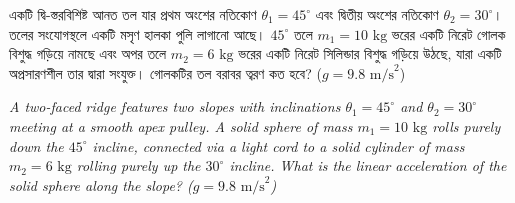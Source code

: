\documentclass[12pt, a4paper]{article}
\begin{document}
\begin{tcolorbox}[questionbox={প্রশ্ন (Question) 23}]
    \noindent
    একটি দ্বি-স্তরবিশিষ্ট আনত তল যার প্রথম অংশের নতিকোণ $\theta_1 = 45^\circ$ এবং দ্বিতীয় অংশের নতিকোণ $\theta_2 = 30^\circ$। তলের সংযোগস্থলে একটি মসৃণ হালকা পুলি লাগানো আছে। $45^\circ$ তলে $m_1 = 10\text{ kg}$ ভরের একটি নিরেট গোলক বিশুদ্ধ গড়িয়ে নামছে এবং অপর তলে $m_2 = 6\text{ kg}$ ভরের একটি নিরেট সিলিন্ডার বিশুদ্ধ গড়িয়ে উঠছে, যারা একটি অপ্রসারণশীল তার দ্বারা সংযুক্ত। গোলকটির তল বরাবর ত্বরণ কত হবে? ($g = 9.8\text{ m/s}^2$)
    
    \vspace{0.8em}
    \begin{english}
    \noindent\textit{\color{darkgray}
    A two-faced ridge features two slopes with inclinations $\theta_1 = 45^\circ$ and $\theta_2 = 30^\circ$ meeting at a smooth apex pulley. A solid sphere of mass $m_1 = 10\text{ kg}$ rolls purely down the $45^\circ$ incline, connected via a light cord to a solid cylinder of mass $m_2 = 6\text{ kg}$ rolling purely up the $30^\circ$ incline. What is the linear acceleration of the solid sphere along the slope? ($g = 9.8\text{ m/s}^2$)
    }
    \end{english}
\end{tcolorbox}

\vspace{1em}
\begin{center}
\end{center}
\vspace{1em}
\end{document}
